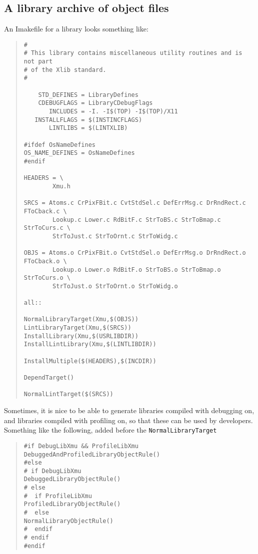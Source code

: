 \subsection{A library archive of object files}

An Imakefile for a library looks something like:

\begin{quote}
\begin{verbatim}
#
# This library contains miscellaneous utility routines and is not part
# of the Xlib standard.
#

    STD_DEFINES = LibraryDefines
    CDEBUGFLAGS = LibraryCDebugFlags
       INCLUDES = -I. -I$(TOP) -I$(TOP)/X11
   INSTALLFLAGS = $(INSTINCFLAGS)
       LINTLIBS = $(LINTXLIB) 

#ifdef OsNameDefines
OS_NAME_DEFINES = OsNameDefines
#endif

HEADERS = \
        Xmu.h

SRCS = Atoms.c CrPixFBit.c CvtStdSel.c DefErrMsg.c DrRndRect.c FToCback.c \
        Lookup.c Lower.c RdBitF.c StrToBS.c StrToBmap.c StrToCurs.c \
        StrToJust.c StrToOrnt.c StrToWidg.c

OBJS = Atoms.o CrPixFBit.o CvtStdSel.o DefErrMsg.o DrRndRect.o FToCback.o \
        Lookup.o Lower.o RdBitF.o StrToBS.o StrToBmap.o StrToCurs.o \
        StrToJust.o StrToOrnt.o StrToWidg.o

all::

NormalLibraryTarget(Xmu,$(OBJS))
LintLibraryTarget(Xmu,$(SRCS))
InstallLibrary(Xmu,$(USRLIBDIR))
InstallLintLibrary(Xmu,$(LINTLIBDIR))

InstallMultiple($(HEADERS),$(INCDIR))

DependTarget()

NormalLintTarget($(SRCS))

\end{verbatim}
\end{quote}

Sometimes, it is nice to be able to generate libraries compiled with
debugging on, and libraries compiled with profiling on, so that these
can be used by developers. Something like the following, added before
the {\tt NormalLibraryTarget} 

\begin{quote}
\begin{verbatim}
#if DebugLibXmu && ProfileLibXmu
DebuggedAndProfiledLibraryObjectRule()
#else
# if DebugLibXmu 
DebuggedLibraryObjectRule()
# else
#  if ProfileLibXmu
ProfiledLibraryObjectRule()
#  else
NormalLibraryObjectRule()
#  endif
# endif
#endif
\end{verbatim}
\end{quote}

